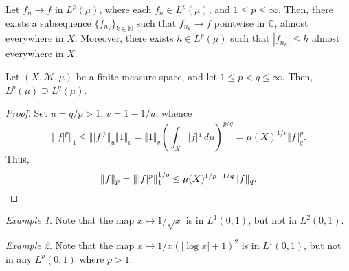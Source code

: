 \documentclass[11pt]{article}
\newcommand{\C}{\mathbb{C}}
\newcommand{\N}{\mathbb{N}}
\newcommand{\M}{\mathcal{M}}
\newcommand{\norm}[1]{\Vert #1 \Vert}
\theoremstyle{definition}
\theoremstyle{remark}
\newtheorem*{example}{Example}
\numberwithin{equation}{section}
\begin{document}
    \begin{corollary}
        Let $f_n \to f$ in $L^p(\mu)$, where each $f_n \in L^p(\mu)$, and $1 \leq p
        \leq \infty$. Then, there exists a subsequence $\{f_{n_k}\}_{k \in \N}$ such
        that $f_{n_k} \to f$ pointwise in $\C$, almost everywhere in $X$. Moreover,
        there exists $h \in L^p(\mu)$ such that $|f_{n_k}| \leq h$ almost everywhere
        in $X$.
    \end{corollary}

    \begin{theorem}
        Let $(X, \M, \mu)$ be a finite measure space, and let $1 \leq p < q \leq
        \infty$. Then, $L^p(\mu) \supseteq L^q(\mu)$.
    \end{theorem}
    \begin{proof}
        Set $u = q / p > 1$, $v = 1 - 1 / u$, whence \[
            \norm{|f|^p}_1 \leq \norm{|f|^p}_u\norm{1}_v = \norm{1}_v\left(\int_X
            |f|^q\:d\mu\right)^{p / q} = \mu(X)^{1 / v} \norm{f}_q^p.
        \] Thus, \[
            \norm{f}_p = \norm{|f|^p}_1^{1 / q} \leq \mu(X)^{1 / p - 1 /
            q}\norm{f}_q. \qedhere
        \] 
    \end{proof}
    \begin{example}
        Note that the map $x \mapsto 1 / \sqrt{x}$ is in $L^1(0, 1)$, but not in
        $L^2(0, 1)$.
    \end{example}
    \begin{example}
        Note that the map $x \mapsto 1 / x(|\log{x}| + 1)^2$ is in $L^1(0, 1)$, but
        not in any $L^p(0, 1)$ where $p > 1$.
    \end{example}
\end{document}
